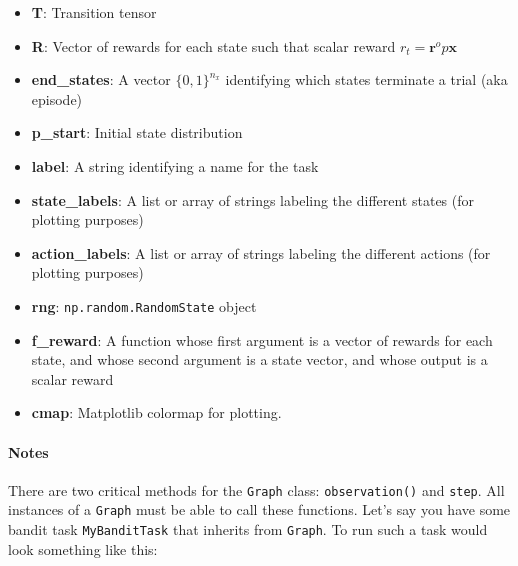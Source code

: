 \begin{itemize}
\tightlist
\item
  \textbf{T}: Transition tensor
\item
  \textbf{R}: Vector of rewards for each state such that scalar reward
  \(r_t = \mathbf r^ op \mathbf x\)
\item
  \textbf{end\_states}: A vector \(\{0, 1\}^{n_x}\) identifying which
  states terminate a trial (aka episode)
\item
  \textbf{p\_start}: Initial state distribution
\item
  \textbf{label}: A string identifying a name for the task
\item
  \textbf{state\_labels}: A list or array of strings labeling the
  different states (for plotting purposes)
\item
  \textbf{action\_labels}: A list or array of strings labeling the
  different actions (for plotting purposes)
\item
  \textbf{rng}: \texttt{np.random.RandomState} object
\item
  \textbf{f\_reward}: A function whose first argument is a vector of
  rewards for each state, and whose second argument is a state vector,
  and whose output is a scalar reward
\item
  \textbf{cmap}: Matplotlib colormap for plotting.
\end{itemize}

\hypertarget{notes}{%
\paragraph{Notes}\label{notes}}

There are two critical methods for the \texttt{Graph} class:
\texttt{observation()} and \texttt{step}. All instances of a
\texttt{Graph} must be able to call these functions. Let's say you have
some bandit task \texttt{MyBanditTask} that inherits from
\texttt{Graph}. To run such a task would look something like this:

\begin{Shaded}
\begin{Highlighting}[]
\OperatorTok{=}
\OperatorTok{=}
 
\OperatorTok{=}
\OperatorTok{=}
\OperatorTok{=}
\end{Highlighting}
\end{Shaded}

